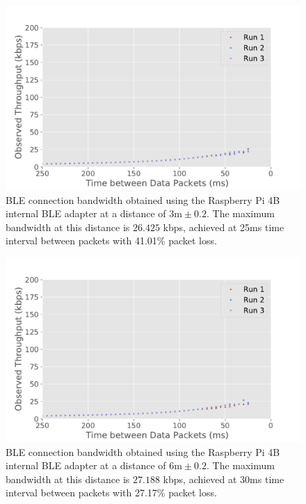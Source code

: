 \begin{figure}[H]
    \centering
    \includegraphics[width=0.75\linewidth]{images/ble-bandwidth-hci1-300cm.pdf}
    \caption[\acs{BLE} connection bandwidth obtained using the ASUS USB-BT500 adapter at a distance of 3m.]    {\acs{BLE} connection bandwidth obtained using the Raspberry Pi 4B internal \acs{BLE} adapter at a distance of $3\text{m} \pm 0.2$. The maximum bandwidth at this distance is $26.425$ kbps, achieved at 25ms time interval between packets with 41.01\% packet loss.}
    \label{fig:ble-bandwidth-hci1-3m}
\end{figure}

\begin{figure}[H]
    \centering
    \includegraphics[width=0.75\linewidth]{images/ble-bandwidth-hci1-600cm.pdf}
    \caption[\acs{BLE} connection bandwidth obtained using the ASUS USB-BT500 adapter at a distance of 6m.]{\acs{BLE} connection bandwidth obtained using the Raspberry Pi 4B internal \acs{BLE} adapter at a distance of $6\text{m} \pm 0.2$. The maximum bandwidth at this distance is $27.188$ kbps, achieved at 30ms time interval between packets with 27.17\% packet loss.}
    \label{fig:ble-bandwidth-hci1-6m}
\end{figure}

